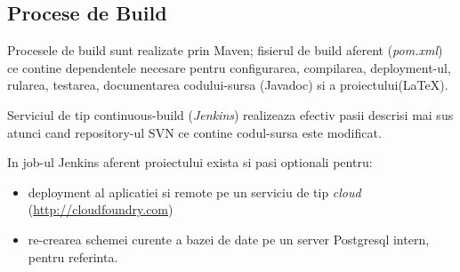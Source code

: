 \subsection{Procese de Build}
Procesele de build sunt realizate prin Maven;
fisierul de build aferent (\emph{pom.xml})
ce contine dependentele necesare pentru configurarea, compilarea,
deployment-ul, rularea, testarea, documentarea codului-sursa (Javadoc) si a proiectului(LaTeX).

Serviciul de tip continuous-build (\emph{Jenkins}) 
realizeaza efectiv pasii descrisi mai sus 
atunci cand repository-ul SVN ce contine codul-sursa este modificat. 

In job-ul Jenkins aferent proiectului exista si pasi optionali pentru:
\begin{itemize}
\item
deployment al aplicatiei si remote pe un
serviciu de tip \emph{cloud} (\url{http://cloudfoundry.com}) 
\item
re-crearea schemei curente a bazei de date pe un server Postgresql intern,
pentru referinta.
\end{itemize}


